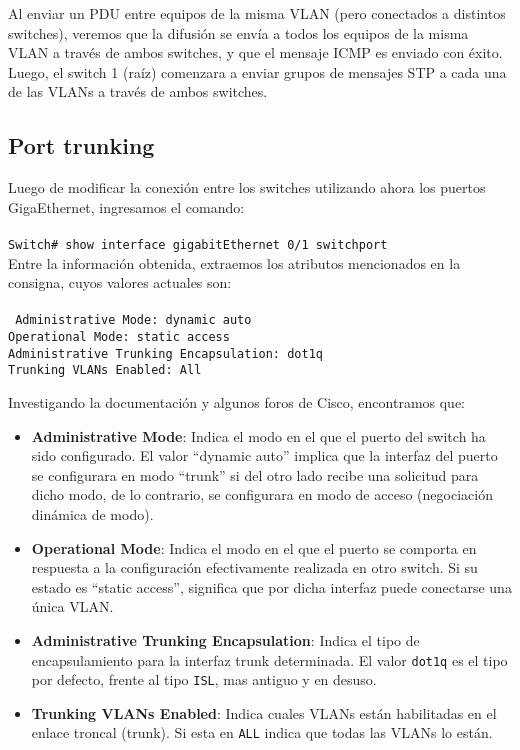 \documentclass{article}
\begin{document}
Al enviar un PDU entre equipos de la misma VLAN (pero conectados a distintos switches), veremos que la difusión se envía a todos los equipos de la misma VLAN a través de ambos switches, y que el mensaje ICMP es enviado con éxito. Luego, el switch 1 (raíz) comenzara a enviar grupos de mensajes STP a cada una de las VLANs a través de ambos switches. \\

\subsection{Port trunking}

Luego de modificar la conexión entre los switches utilizando ahora los puertos GigaEthernet, ingresamos el comando: \\\\
\texttt{Switch\# show interface gigabitEthernet 0/1 switchport} \\

Entre la información obtenida, extraemos los atributos mencionados en la consigna, cuyos valores actuales son: \\\\
\texttt{
        Administrative Mode: dynamic auto \\
	Operational Mode: static access \\
	Administrative Trunking Encapsulation: dot1q \\
	Trunking VLANs Enabled: All \\
}

Investigando la documentación y algunos foros de Cisco, encontramos que: \\

\begin{itemize}
    \item \textbf{Administrative Mode}: Indica el modo en el que el puerto del switch ha sido configurado. El valor ``dynamic auto'' implica que la interfaz del puerto se configurara en modo ``trunk'' si del otro lado recibe una solicitud para dicho modo, de lo contrario, se configurara en modo de acceso (negociación dinámica de modo).
    \item \textbf{Operational Mode}: Indica el modo en el que el puerto se comporta en respuesta a la configuración efectivamente realizada en otro switch. Si su estado es ``static access'', significa que por dicha interfaz puede conectarse una única VLAN.
    \item \textbf{Administrative Trunking Encapsulation}: Indica el tipo de encapsulamiento para la interfaz trunk determinada. El valor \texttt{dot1q} es el tipo por defecto, frente al tipo \texttt{ISL}, mas antiguo y en desuso.
    \item \textbf{Trunking VLANs Enabled}: Indica cuales VLANs están habilitadas en el enlace troncal (trunk). Si esta en \texttt{ALL} indica que todas las VLANs lo están.
\end{itemize}
\end{document}

